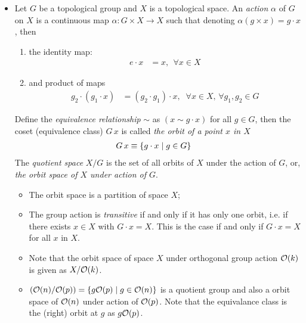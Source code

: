 \documentclass[11pt]{article}
\begin{document}
\begin{itemize}
\item Let $G$ be a topological group and $X$ is a topological space. An \emph{action} $\alpha$ of $G$ on $X$ is a continuous map $\alpha: G\times X \to X$ such that denoting $\alpha(g \times x) = g\cdot x$, then
 \begin{enumerate}
\item the identity map:
\begin{align*}
e\cdot x &= x,\,\; \forall x\in X
\end{align*}
\item and product of maps
\begin{align*}
g_{2} \cdot (g_{1}\cdot x) &= (g_{2}\cdot g_{1}) \cdot x,\;\; \forall x\in X,\, \forall g_{1}, g_{2}\in G
\end{align*}
\end{enumerate}

Define the \emph{equivalence relationship} $\sim$ as $(x \sim g\cdot x)$ for all $g\in G$, then the coset (equivalence class) $G\,x$ is called \emph{the orbit of a point $x$ in $X$}
\begin{align*}
G\,x &\equiv \left\{g\cdot x\;|\; g\in G \right\}
\end{align*}
The \emph{quotient space} $X/G$ is the set of all orbits of $X$ under the action of $G$, or, \emph{the orbit space of $X$ under action of $G$}.\\

\begin{itemize}
\item The orbit space is a partition of space $X$; 

\item The group action is \emph{transitive} if and only if it has only one orbit, i.e. if there exists $x \in X$ with $G\cdot x = X$. This is the case if and only if $G\cdot x = X$ for all $x$ in $X$.

\item Note that the orbit space of space $X$ under orthogonal group action ${\mathcal O}(k)$ is given as $X/{\mathcal O}(k)$.

\item $\left({\mathcal O}(n)/{\mathcal O}(p)\right) = \left\{g{\mathcal O}(p)  \;|\; g\in {\mathcal O}(n) \right\}$ is a quotient group and also a orbit space of ${\mathcal O}(n)$ under action of ${\mathcal O}(p)$. Note that the equivalance class is the (right) orbit at $g$ as $g{\mathcal O}(p)$.  \\[10pt] 
\end{itemize}







\end{itemize}
\end{document}

